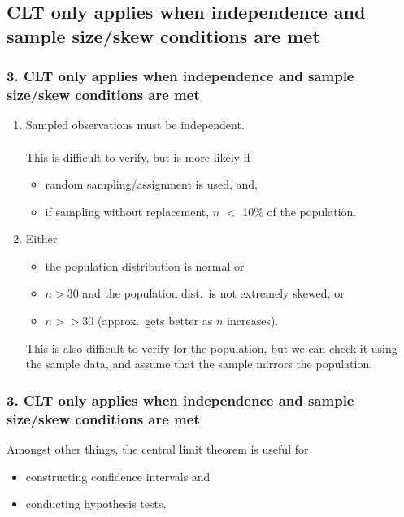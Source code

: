 \documentclass[11pt,containsverbatim,handout,xcolor=xelatex,dvipsnames,table]{beamer}
\begin{document}

\subsection{CLT only applies when independence and sample size/skew conditions are met}
\label{mi3}


\begin{frame}
\frametitle{3. CLT only applies when independence and sample size/skew conditions are met}

\begin{enumerate}

\item {} Sampled observations must be independent. \\

$\:$ \\
This is difficult to verify, but is more likely if
\begin{itemize}
\item random sampling/assignment is used, and,
\item if sampling without replacement, $n$ $<$ 10\% of the population.
\end{itemize}

\pause

\item {} Either 

\begin{itemize}
\item the population distribution is normal or
\item $n > 30$ and the population dist.\ is not extremely skewed, or
\item $n >> 30$ (approx.\ gets better as $n$ increases).
\end{itemize}

This is also difficult to verify for the population, but we can check it using the sample data, and assume that the sample mirrors the population.

\end{enumerate}

\end{frame}


\begin{frame}
\frametitle{3. CLT only applies when independence and sample size/skew conditions are met}

Amongst other things, the central limit theorem is useful for 
\begin{itemize}
\item constructing confidence intervals and
\item conducting hypothesis tests.
\end{itemize}

\end{frame}
\end{document}
